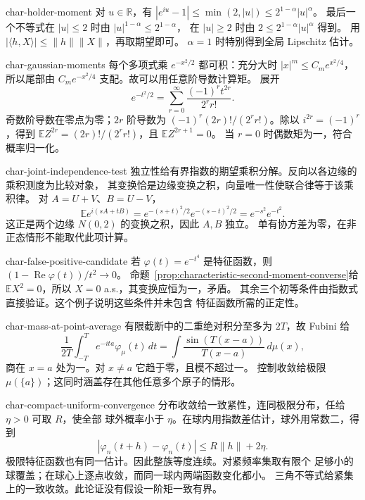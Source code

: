 \begin{solution}{char-holder-moment}
对 $u\in\mathbb R$，有
$|e^{iu}-1|\le\min(2,|u|)\le2^{1-\alpha}|u|^\alpha$。
最后一个不等式在 $|u|\le2$ 时由 $|u|^{1-\alpha}\le2^{1-\alpha}$，
在 $|u|\ge2$ 时由 $2\le2^{1-\alpha}|u|^\alpha$ 得到。
用 $|\langle h,X\rangle|\le\|h\|\|X\|$，再取期望即可。
$\alpha=1$ 时特别得到全局 Lipschitz 估计。
\end{solution}

\begin{solution}{char-gaussian-moments}
每个多项式乘 $e^{-x^2/2}$ 都可积：充分大时 $|x|^m\le C_me^{x^2/4}$，
所以尾部由 $C_me^{-x^2/4}$ 支配。故可以用任意阶导数计算矩。
展开
\[
 e^{-t^2/2}=\sum_{r=0}^\infty\frac{(-1)^rt^{2r}}{2^rr!}.
\]
奇数阶导数在零点为零；$2r$ 阶导数为
$(-1)^r(2r)!/(2^rr!)$。除以 $i^{2r}=(-1)^r$，得到
$\mathbb E Z^{2r}=(2r)!/(2^rr!)$，且 $\mathbb E Z^{2r+1}=0$。
当 $r=0$ 时偶数矩为一，符合概率归一化。
\end{solution}

\begin{solution}{char-joint-independence-test}
独立性给有界指数的期望乘积分解。反向以各边缘的乘积测度为比较对象，
其变换恰是边缘变换之积，向量唯一性使联合律等于该乘积律。
对 $A=U+V$、$B=U-V$，
\[
 \mathbb E e^{i(sA+tB)}
 =e^{-(s+t)^2/2}e^{-(s-t)^2/2}
 =e^{-s^2}e^{-t^2}.
\]
这正是两个边缘 $N(0,2)$ 的变换之积，因此 $A,B$ 独立。
单有协方差为零，在非正态情形不能取代此项计算。
\end{solution}

\begin{solution}{char-false-positive-candidate}
若 $\varphi(t)=e^{-t^4}$ 是特征函数，则
$(1-\operatorname{Re}\varphi(t))/t^2\to0$。
命题~\ref{prop:characteristic-second-moment-converse}给
$\mathbb E X^2=0$，所以 $X=0$ a.s.，其变换应恒为一，矛盾。
其余三个初等条件由指数式直接验证。这个例子说明这些条件并未包含
特征函数所需的正定性。
\end{solution}

\begin{solution}{char-mass-at-point-average}
有限截断中的二重绝对积分至多为 $2T$，故 Fubini 给
\[
 \frac1{2T}\int_{-T}^T e^{-ita}\varphi_\mu(t)\,dt
 =\int\frac{\sin(T(x-a))}{T(x-a)}\,d\mu(x),
\]
商在 $x=a$ 处为一。对 $x\ne a$ 它趋于零，且模不超过一。
控制收敛给极限 $\mu(\{a\})$；这同时涵盖存在其他任意多个原子的情形。
\end{solution}

\begin{solution}{char-compact-uniform-convergence}
分布收敛给一致紧性，连同极限分布，任给 $\eta>0$ 可取 $R$，使全部
球外概率小于 $\eta$。在球内用指数差估计，球外用常数二，得到
\[
 |\varphi_n(t+h)-\varphi_n(t)|\le R\|h\|+2\eta.
\]
极限特征函数也有同一估计。因此整族等度连续。对紧频率集取有限个
足够小的球覆盖；在球心上逐点收敛，而同一球内两端函数变化都小。
三角不等式给紧集上的一致收敛。此论证没有假设一阶矩一致有界。
\end{solution}

